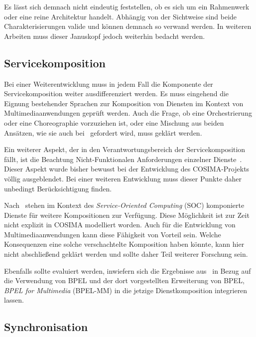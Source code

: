   Es lässt sich demnach nicht eindeutig feststellen, ob es sich um ein Rahmenwerk oder eine reine Architektur handelt. Abhängig von der Sichtweise sind beide Charakterisierungen valide und können demnach so verwand werden. In weiteren Arbeiten muss dieser Januskopf jedoch weiterhin bedacht werden.


\subsection{Servicekomposition} %
\label{sub:servicekomposition_fragen}

  Bei einer Weiterentwicklung muss in jedem Fall die Komponente der Servicekomposition weiter ausdifferenziert werden. Es muss eingehend die Eignung bestehender Sprachen zur Komposition von Diensten im Kontext von Multimediaanwendungen geprüft werden. Auch die Frage, ob eine Orchestrierung oder eine Choreographie vorzuziehen ist, oder eine Mischung aus beiden Ansätzen, wie sie auch bei~\citep{papazoglou2007soc} gefordert wird, muss geklärt werden.
  
  Ein weiterer Aspekt, der in den Verantwortungsbereich der Servicekomposition fällt, ist die Beachtung Nicht-Funktionalen Anforderungen einzelner Dienste~\citep[S. 42]{papazoglou2007soc}. Dieser Aspekt wurde bisher bewusst bei der Entwicklung des COSIMA-Projekts völlig ausgeblendet. Bei einer weiteren Entwicklung muss dieser Punkte daher unbedingt Berücksichtigung finden.

  Nach~\citep[S. 8]{service_oriented_computing} stehen im Kontext des \emph{Service-Oriented Computing} (SOC) komponierte Dienste für weitere Kompositionen zur Verfügung. Diese Möglichkeit ist zur Zeit nicht explizit in COSIMA modelliert worden. Auch für die Entwicklung von Multimediaanwendungen kann diese Fähigkeit von Vorteil sein. Welche Konsequenzen eine solche verschachtelte Komposition haben könnte, kann hier nicht abschließend geklärt werden und sollte daher Teil weiterer Forschung sein.
  
  Ebenfalls sollte evaluiert werden, inwiefern sich die Ergebnisse aus~\citep{samma08} in Bezug auf die Verwendung von BPEL und der dort vorgestellten Erweiterung von BPEL, \emph{BPEL for Multimedia} (BPEL-MM) in die jetzige Dienstkomposition integrieren lassen.


\subsection{Synchronisation} %
\label{sub:synchronisation}

